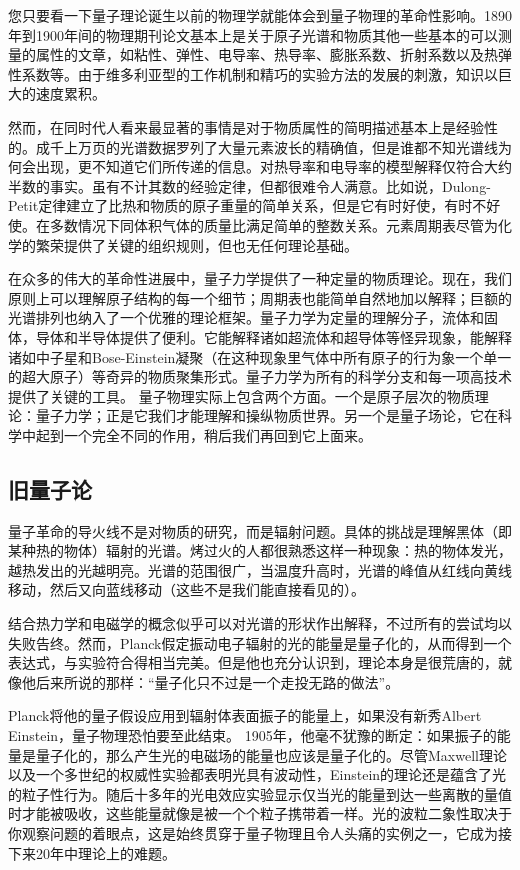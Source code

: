 \documentclass[13pt,a4paper]{article}
\begin{document}
\begin{CJK}{UTF8}{song}
您只要看一下量子理论诞生以前的物理学就能体会到量子物理的革命性影响。1890年到1900年间的物理期刊论文基本上是关于原子光谱和物质其他一些基本的可以测量的属性的文章，如粘性、弹性、电导率、热导率、膨胀系数、折射系数以及热弹性系数等。由于维多利亚型的工作机制和精巧的实验方法的发展的刺激，知识以巨大的速度累积。

然而，在同时代人看来最显著的事情是对于物质属性的简明描述基本上是经验性的。成千上万页的光谱数据罗列了大量元素波长的精确值，但是谁都不知光谱线为何会出现，更不知道它们所传递的信息。对热导率和电导率的模型解释仅符合大约半数的事实。虽有不计其数的经验定律，但都很难令人满意。比如说，Dulong-Petit定律建立了比热和物质的原子重量的简单关系，但是它有时好使，有时不好使。在多数情况下同体积气体的质量比满足简单的整数关系。元素周期表尽管为化学的繁荣提供了关键的组织规则，但也无任何理论基础。

在众多的伟大的革命性进展中，量子力学提供了一种定量的物质理论。现在，我们原则上可以理解原子结构的每一个细节；周期表也能简单自然地加以解释；巨额的光谱排列也纳入了一个优雅的理论框架。量子力学为定量的理解分子，流体和固体，导体和半导体提供了便利。它能解释诸如超流体和超导体等怪异现象，能解释诸如中子星和Bose-Einstein凝聚（在这种现象里气体中所有原子的行为象一个单一的超大原子）等奇异的物质聚集形式。量子力学为所有的科学分支和每一项高技术提供了关键的工具。
量子物理实际上包含两个方面。一个是原子层次的物质理论：量子力学；正是它我们才能理解和操纵物质世界。另一个是量子场论，它在科学中起到一个完全不同的作用，稍后我们再回到它上面来。
 

\subsection{旧量子论}
量子革命的导火线不是对物质的研究，而是辐射问题。具体的挑战是理解黑体（即某种热的物体）辐射的光谱。烤过火的人都很熟悉这样一种现象：热的物体发光，越热发出的光越明亮。光谱的范围很广，当温度升高时，光谱的峰值从红线向黄线移动，然后又向蓝线移动（这些不是我们能直接看见的）。

结合热力学和电磁学的概念似乎可以对光谱的形状作出解释，不过所有的尝试均以失败告终。然而，Planck假定振动电子辐射的光的能量是量子化的，从而得到一个表达式，与实验符合得相当完美。但是他也充分认识到，理论本身是很荒唐的，就像他后来所说的那样：“量子化只不过是一个走投无路的做法”。

Planck将他的量子假设应用到辐射体表面振子的能量上，如果没有新秀Albert Einstein，量子物理恐怕要至此结束。 1905年，他毫不犹豫的断定：如果振子的能量是量子化的，那么产生光的电磁场的能量也应该是量子化的。尽管Maxwell理论以及一个多世纪的权威性实验都表明光具有波动性，Einstein的理论还是蕴含了光的粒子性行为。随后十多年的光电效应实验显示仅当光的能量到达一些离散的量值时才能被吸收，这些能量就像是被一个个粒子携带着一样。光的波粒二象性取决于你观察问题的着眼点，这是始终贯穿于量子物理且令人头痛的实例之一，它成为接下来20年中理论上的难题。


\end{CJK}
\end{document}

